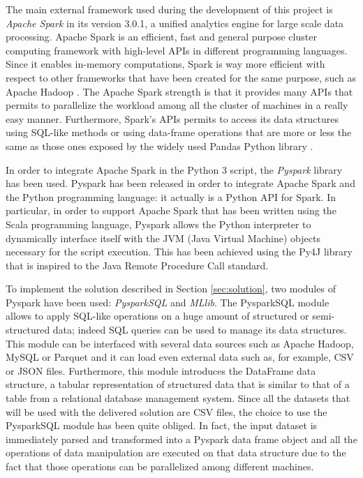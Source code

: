 The main external framework used during the development of this project is \textit{Apache Spark} \cite{spark-reference} in its version 3.0.1, a unified analytics engine for large scale data processing. Apache Spark is an efficient, fast and general purpose cluster computing framework with high-level APIs in different programming languages. Since it enables in-memory computations, Spark is way more efficient with respect to other frameworks that have been created for the same purpose, such as Apache Hadoop \cite{hadoop-reference}. The Apache Spark strength is that it provides many APIs that permits to parallelize the workload among all the cluster of machines in a really easy manner. Furthermore, Spark's APIs permits to access its data structures using SQL-like methods or using data-frame operations that are more or less the same as those ones exposed by the widely used Pandas Python library \cite{python-pandas}.

In order to integrate Apache Spark in the Python 3 script, the \textit{Pyspark} library \cite{pyspark-reference} has been used. Pyspark has been released in order to integrate Apache Spark and the Python programming language: it actually is a Python API for Spark. In particular, in order to support Apache Spark that has been written using the Scala programming language, Pyspark allows the Python interpreter to dynamically interface itself with the JVM (Java Virtual Machine) objects necessary for the script execution. This has been achieved using the Py4J library \cite{py4j-reference} that is inspired to the Java Remote Procedure Call standard. 

\noindent To implement the solution described in Section \ref{sec:solution}, two modules of Pyspark have been used: \textit{PysparkSQL} and \textit{MLlib}. The PysparkSQL module allows to apply SQL-like operations on a huge amount of structured or semi-structured data; indeed SQL queries can be used to manage its data structures. This module can be interfaced with several data sources such as Apache Hadoop, MySQL or Parquet and it can load even external data such as, for example, CSV or JSON files. Furthermore, this module introduces the DataFrame data structure, a tabular representation of structured data that is similar to that of a table from a relational database management system. Since all the datasets that will be used with the delivered solution are CSV files, the choice to use the PysparkSQL module has been quite obliged. In fact, the input dataset is immediately parsed and transformed into a Pyspark data frame object and all the operations of data manipulation are executed on that data structure due to the fact that those operations can be parallelized among different machines.


